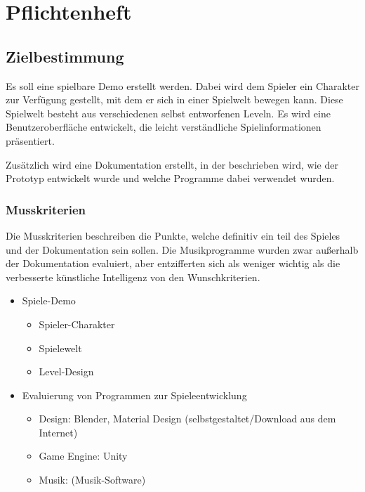 \pagebreak
{}
\chapter{Pflichtenheft}
\section{Zielbestimmung}

Es soll eine spielbare Demo erstellt werden. Dabei wird dem Spieler ein Charakter zur Verfügung gestellt, mit dem er sich in einer Spielwelt bewegen kann. Diese Spielwelt besteht aus verschiedenen selbst entworfenen Leveln. Es wird eine Benutzeroberfläche entwickelt, die leicht verständliche Spielinformationen präsentiert.

Zusätzlich wird eine Dokumentation erstellt, in der beschrieben wird, wie der Prototyp entwickelt wurde und welche Programme dabei verwendet wurden.

\subsection{Musskriterien}
Die Musskriterien beschreiben die Punkte, welche definitiv ein teil des Spieles und der Dokumentation sein sollen. Die Musikprogramme wurden zwar außerhalb der Dokumentation evaluiert, aber entzifferten sich als weniger wichtig als die verbesserte künstliche Intelligenz von den Wunschkriterien.

\begin{itemize}
  \item Spiele-Demo
  \begin{itemize}
    \item Spieler-Charakter
    \item Spielewelt
    \item Level-Design
  \end{itemize}
  \item Evaluierung von Programmen zur Spieleentwicklung
  \begin{itemize}
    \item Design: Blender, Material Design (selbstgestaltet/Download aus dem Internet)
    \item Game Engine: Unity
    \item Musik: (Musik-Software)
  \end{itemize}
\end{itemize}

\pagebreak


